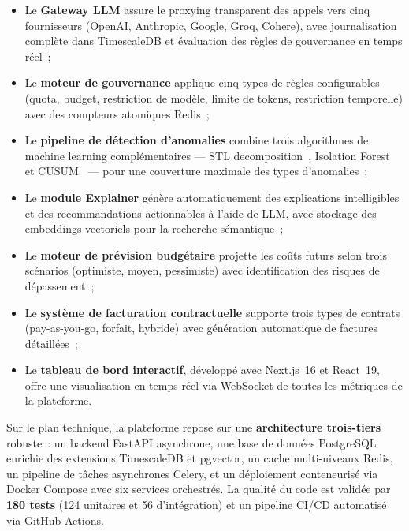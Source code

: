 \begin{itemize}[noitemsep]
    \item Le \textbf{Gateway LLM} assure le proxying transparent des appels vers cinq fournisseurs (OpenAI, Anthropic, Google, Groq, Cohere), avec journalisation complète dans TimescaleDB et évaluation des règles de gouvernance en temps réel~;
    \item Le \textbf{moteur de gouvernance} applique cinq types de règles configurables (quota, budget, restriction de modèle, limite de tokens, restriction temporelle) avec des compteurs atomiques Redis~;
    \item Le \textbf{pipeline de détection d'anomalies} combine trois algorithmes de machine learning complémentaires --- STL decomposition~\cite{cleveland1990}, Isolation Forest~\cite{liu2008} et CUSUM~\cite{page1954} --- pour une couverture maximale des types d'anomalies~;
    \item Le \textbf{module Explainer} génère automatiquement des explications intelligibles et des recommandations actionnables à l'aide de LLM, avec stockage des embeddings vectoriels pour la recherche sémantique~;
    \item Le \textbf{moteur de prévision budgétaire} projette les coûts futurs selon trois scénarios (optimiste, moyen, pessimiste) avec identification des risques de dépassement~;
    \item Le \textbf{système de facturation contractuelle} supporte trois types de contrats (pay-as-you-go, forfait, hybride) avec génération automatique de factures détaillées~;
    \item Le \textbf{tableau de bord interactif}, développé avec Next.js~16 et React~19, offre une visualisation en temps réel via WebSocket de toutes les métriques de la plateforme.
\end{itemize}

\vspace{0.3cm}

Sur le plan technique, la plateforme repose sur une \textbf{architecture trois-tiers} robuste~: un backend FastAPI asynchrone, une base de données PostgreSQL enrichie des extensions TimescaleDB et pgvector, un cache multi-niveaux Redis, un pipeline de tâches asynchrones Celery, et un déploiement conteneurisé via Docker Compose avec six services orchestrés. La qualité du code est validée par \textbf{180 tests} (124 unitaires et 56 d'intégration) et un pipeline CI/CD automatisé via GitHub Actions.

\vspace{0.3cm}

